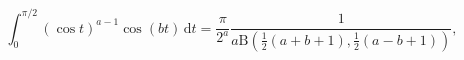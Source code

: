 \[\int_{0}^{\pi/2}(\cos t)^{a-1}\cos\left(bt\right)\,\mathrm{d}t=\frac{\pi}{2^{a%
}}\frac{1}{a\mathrm{B}\left(\frac{1}{2}(a+b+1),\frac{1}{2}(a-b+1)\right)},\]